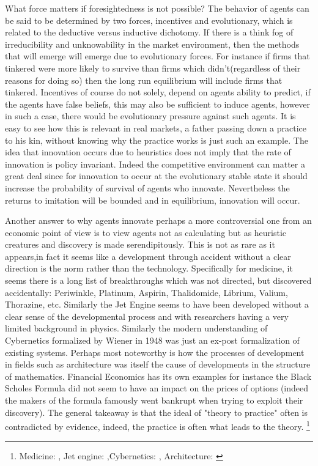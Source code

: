 \documentclass[12pt]{article}
\numberwithin{equation}{section}
\begin{document}
What force matters if foresightedness is not possible? The behavior of agents can be said to be determined by two forces, incentives and evolutionary, which is related to the deductive versus inductive dichotomy. If there is a think fog of irreducibility and unknowability in the market environment, then the methods that will emerge will emerge due to evolutionary forces. For instance if firms that tinkered were more likely to survive than firms which didn't(regardless of their reasons for doing so) then the long run equilibrium will include firms that tinkered. Incentives of course do not solely, depend on agents ability to predict, if the agents have false beliefs, this may also be sufficient to induce agents, however in such a case, there would be evolutionary pressure against such agents. It is easy to see how this is relevant in real markets, a father passing down a practice to his kin, without knowing why the practice works is just such an example. The idea that innovation occurs due to heuristics does not imply that the rate of innovation is policy invariant. Indeed the competitive environment can matter a great deal since for innovation to occur at the evolutionary stable state it should increase the probability of survival of agents who innovate. Nevertheless the returns to imitation will be bounded and in equilibrium, innovation will occur. \citep{Winter1993}


Another answer to why agents innovate perhaps a more controversial one from an economic point of view is to view agents not as calculating but as heuristic creatures and discovery is made serendipitously. This is not as rare as it appears,in fact it seems like a development through accident without a clear direction is the norm rather than the technology. Specifically for medicine, it seems there is a long list of breakthroughs which was not directed, but discovered accidentally: Periwinkle, Platinum, Aspirin, Thalidomide, Librium, Valium, Thorazine, etc. Similarly the Jet Engine seems to have been developed without a clear sense of the developmental process and with researchers having a very limited background in physics. Similarly the modern understanding of Cybernetics formalized by Wiener in 1948 was just an ex-post formalization of existing systems. Perhaps most noteworthy is how the processes of development in fields such as architecture was itself the cause of developments in the structure of mathematics. Financial Economics has its own examples for instance the Black Scholes Formula did not seem to have an impact on the prices of options (indeed the makers of the formula famously went bankrupt when trying to exploit their discovery). The general takeaway is that the ideal of "theory to practice" often is contradicted by evidence, indeed, the practice is often what leads to the theory. \footnote{ Medicine: \cite{meyers2007happy}, Jet engine: \cite{scranton2006urgency},Cybernetics: \cite{mindell2002between}, Architecture: \cite{unguru1992guy}}
\end{document}
